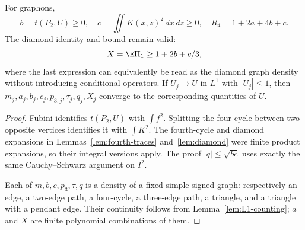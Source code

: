 \begin{lemma}
\label{lem:integral-moments}
\proved For graphons,
\[
 b=t(P_2,U)\ge0,\quad
 c=\iint K(x,z)^2\,dx\,dz\ge0,\quad
 R_4=1+2a+4b+c.
\]
The diamond identity and bound remain valid:
\[
 X=\E\Pi_1\ge1+2b+c/3,
\]
where the last expression can equivalently be read as the diamond graph density without
introducing conditional operators.  If $U_j\to U$ in $L^1$ with $|U_j|\le1$, then
$m_j,a_j,b_j,c_j,p_{3,j},\tau_j,q_j,X_j$ converge to the corresponding quantities of $U$.
\end{lemma}
\begin{proof}
Fubini identifies $t(P_2,U)$ with $\int f^2$.  Splitting the four-cycle between two opposite
vertices identifies it with $\int K^2$.  The fourth-cycle and diamond expansions in
Lemmas~\ref{lem:fourth-traces} and~\ref{lem:diamond} were finite product expansions, so their
integral versions apply.  The proof $|q|\le\sqrt{bc}$ uses exactly the same Cauchy--Schwarz
argument on $I^2$.

Each of $m,b,c,p_3,\tau,q$ is a density of a fixed simple signed graph: respectively an edge,
a two-edge path, a four-cycle, a three-edge path, a triangle, and a triangle with a pendant
edge.  Their continuity follows from Lemma~\ref{lem:L1-counting}; $a$ and $X$ are finite
polynomial combinations of them.
\end{proof}

